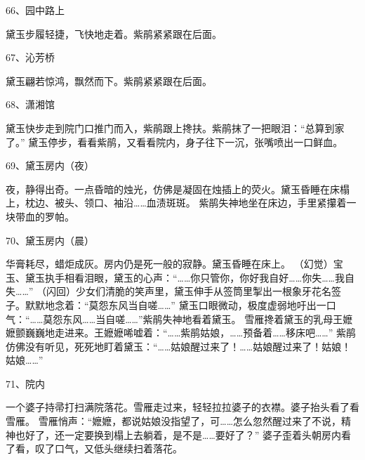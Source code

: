 66、园中路上\par 
黛玉步履轻捷，飞快地走着。紫鹃紧紧跟在后面。 

67、沁芳桥\par 
黛玉翩若惊鸿，飘然而下。紫鹃紧紧跟在后面。 

68、潇湘馆\par 
黛玉快步走到院门口推门而入，紫鹃跟上搀扶。紫鹃抹了一把眼泪：“总算到家了。” 
黛玉停步，看看紫鹃，又看看院内，身子往下一沉，张嘴喷出一口鲜血。 

69、黛玉房内（夜）\par 
夜，静得出奇。一点昏暗的烛光，仿佛是凝固在烛插上的荧火。黛玉昏睡在床榻上，枕边、被头、领口、袖沿……血渍斑斑。 
紫鹃失神地坐在床边，手里紧攥着一块带血的罗帕。 

70、黛玉房内（晨）\par 
华膏耗尽，蜡炬成灰。房内仍是死一般的寂静。黛玉昏睡在床上。 
（幻觉）宝玉、黛玉执手相看泪眼，黛玉的心声：“……你只管你，你好我自好……你失……我自失……” 
（闪回）少女们清脆的笑声里，黛玉伸手从签筒里掣出一根象牙花名签子。默默地念着：“莫怨东风当自嗟……” 
黛玉口眼微动，极度虚弱地吁出一口气：“……莫怨东风……当自嗟……”紫鹃失神地看着黛玉。 
雪雁搀着黛玉的乳母王嬷嬷颤巍巍地走进来。王嬷嬷唏嘘着：“……紫鹃姑娘，……预备着……移床吧……” 
紫鹃仿佛没有听见，死死地盯着黛玉：“……姑娘醒过来了！……姑娘醒过来了！姑娘！姑娘……” 

71、院内\par
一个婆子持帚打扫满院落花。雪雁走过来，轻轻拉拉婆子的衣襟。婆子抬头看了看雪雁。 
雪雁悄声：“嬷嬷，都说姑娘没指望了，可……怎么忽然醒过来了不说，精神也好了，还一定要换到榻上去躺着，是不是……要好了？” 
婆子歪着头朝房内看了看，叹了口气，又低头继续扫着落花。 

